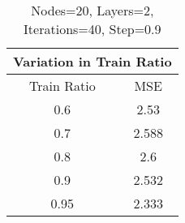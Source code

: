 \documentclass[a4paper,11pt]{article}
\begin{document}
\begin{table}[h]
\centering
\begin{tabular}{|c|c|}
\hline 
\multicolumn{2}{|c|}{Variation in Train Ratio}\\ 
\hline
Train Ratio & MSE\\ 
\hline
0.6 & 2.53\\ 
\hline
0.7 & 2.588\\ 
\hline
0.8 & 2.6\\ 
\hline
0.9 & 2.532\\ 
\hline
0.95 & 2.333\\ 
\hline
\hline\end{tabular}
\label{table:table}
\caption{\small{Nodes=20, Layers=2, Iterations=40, Step=0.9}} 
\end{table}
\end{document}
